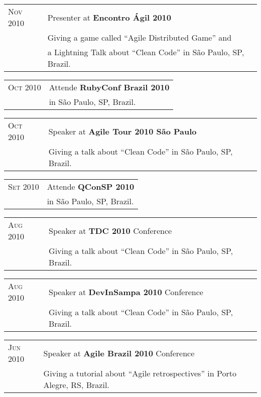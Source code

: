 \documentclass[letter,10pt]{article}
\begin{document}
\begin{tabular}{p{2.5cm}l}
  \textsc{Nov 2010} & Presenter at \textbf{Encontro Ágil 2010}\\
  &Giving a game called ``Agile Distributed Game'' and\\
  & a Lightning Talk about ``Clean Code'' in São Paulo, SP, Brazil.\\
\end{tabular}

\begin{tabular}{p{2.5cm}l}
  \textsc{Oct 2010} & Attende \textbf{RubyConf Brazil 2010}\\
  & in São Paulo, SP, Brazil.\\
\end{tabular}

\begin{tabular}{p{2.5cm}l}
  \textsc{Oct 2010} & Speaker at \textbf{Agile Tour 2010 São Paulo}\\
  &Giving a talk about ``Clean Code'' in São Paulo, SP, Brazil.\\
\end{tabular}

\begin{tabular}{p{2.5cm}l}
  \textsc{Set 2010} & Attende \textbf{QConSP 2010}\\
  & in São Paulo, SP, Brazil.\\
\end{tabular}

\begin{tabular}{p{2.5cm}l}
  \textsc{Aug 2010} & Speaker at \textbf{TDC 2010} Conference\\
  &Giving a talk about ``Clean Code'' in São Paulo, SP, Brazil.\\
\end{tabular}

\begin{tabular}{p{2.5cm}l}
  \textsc{Aug 2010} & Speaker at \textbf{DevInSampa 2010} Conference\\
  &Giving a talk about ``Clean Code'' in São Paulo, SP, Brazil.\\
\end{tabular}

\begin{tabular}{p{2.5cm}l}
  \textsc{Jun 2010} & Speaker at \textbf{Agile Brazil 2010} Conference\\
  &Giving a tutorial about ``Agile retrospectives'' in Porto Alegre, RS, Brazil.\\
\end{tabular}
\end{document}
